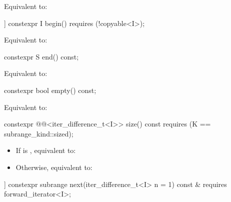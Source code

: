 \begin{itemdescr}
\pnum
\effects
Equivalent to: 
\end{itemdescr}

%
\begin{itemdecl}
[[nodiscard]] constexpr I begin() requires (!copyable<I>);
\end{itemdecl}

\begin{itemdescr}
\pnum
\effects
Equivalent to: 
\end{itemdescr}

%
\begin{itemdecl}
constexpr S end() const;
\end{itemdecl}

\begin{itemdescr}
\pnum
\effects
Equivalent to: 
\end{itemdescr}

%
\begin{itemdecl}
constexpr bool empty() const;
\end{itemdecl}

\begin{itemdescr}
\pnum
\effects
Equivalent to: 
\end{itemdescr}

%
\begin{itemdecl}
constexpr @@<iter_difference_t<I>> size() const
  requires (K == subrange_kind::sized);
\end{itemdecl}

\begin{itemdescr}
\pnum
\effects
\begin{itemize}
\item If  is , equivalent to: 
\item Otherwise, equivalent to: 
\end{itemize}
\end{itemdescr}

%
\begin{itemdecl}
[[nodiscard]] constexpr subrange next(iter_difference_t<I> n = 1) const &
  requires forward_iterator<I>;
\end{itemdecl}

